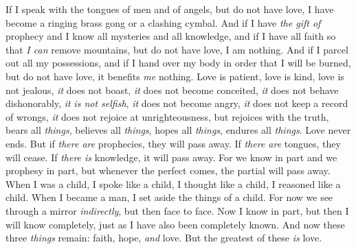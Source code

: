 \begin{biblechapter} %
 If I speak with the tongues of men and of angels, but do not have love, I have become a ringing brass gong or a clashing cymbal.
\verse And if I have \textit{the gift of} prophecy and I know all mysteries and all knowledge, and if I have all faith so that \textit{I can} remove mountains, but do not have love, I am nothing.
\verse And if I parcel out all my possessions, and if I hand over my body in order that I will be burned, but do not have love, it benefits \textit{me} nothing.
\verse Love is patient, love is kind, love is not jealous, \textit{it} does not boast, \textit{it} does not become conceited,
\verse \textit{it} does not behave dishonorably, \textit{it} \textit{is not selfish}, \textit{it} does not become angry, \textit{it} does not keep a record of wrongs,
\verse \textit{it} does not rejoice at unrighteousness, but rejoices with the truth,
\verse bears all \textit{things}, believes all \textit{things}, hopes all \textit{things}, endures all \textit{things}.
\verse Love never ends. But if \textit{there are} prophecies, they will pass away. If \textit{there are} tongues, they will cease. If \textit{there is} knowledge, it will pass away.
\verse For we know in part and we prophesy in part,
\verse but whenever the perfect comes, the partial will pass away.
\verse When I was a child, I spoke like a child, I thought like a child, I reasoned like a child. When I became a man, I set aside the things of a child.
\verse For now we see through a mirror \textit{indirectly}, but then face to face. Now I know in part, but then I will know completely, just as I have also been completely known.
\verse And now these three \textit{things} remain: faith, hope, \textit{and} love. But the greatest of these \textit{is} love.
\end{biblechapter}

